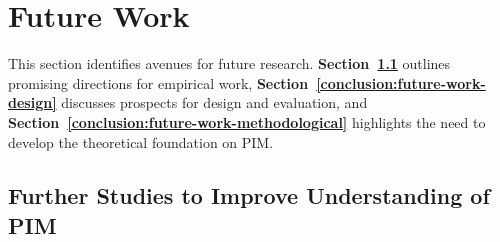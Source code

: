 

\newpage
\section{Future Work}
\label{conclusion:future-work}
This section identifies avenues for future research.  \textbf{Section~\ref{conclusion:future-work-empirical}} outlines promising directions for empirical work, 
\textbf{Section~\ref{conclusion:future-work-design}} discusses prospects for design and evaluation, and 
\textbf{Section~\ref{conclusion:future-work-methodological}} highlights the need to develop the theoretical foundation on PIM.



\subsection{Further Studies to Improve Understanding of PIM}
\label{conclusion:future-work-empirical}

